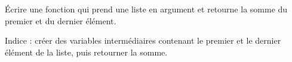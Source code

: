 
\begin{exercice}\label{exoPremiere-0066}

    Écrire une fonction qui prend une liste en argument et retourne la somme du premier et du dernier élément.

    Indice : créer des variables intermédiaires contenant le premier et le dernier élément de la liste, puis retourner la somme.

\end{exercice}
